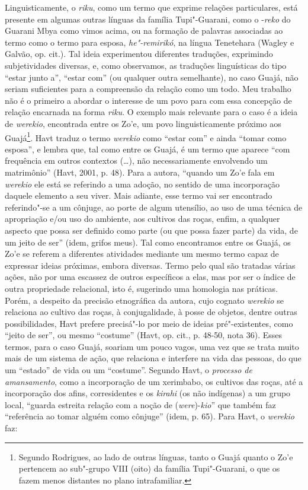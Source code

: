 Linguisticamente, o \emph{riku}, como um termo que exprime relações
particulares, está presente em algumas outras línguas da família
Tupi"-Guarani, como o -\emph{reko} do Guarani Mbya como vimos acima, ou
na formação de palavras associadas ao termo como o termo para esposa,
\emph{he"-remirikó}, na língua Tenetehara (Wagley e Galvão, op. cit.).
Tal ideia experimentou diferentes traduções, exprimindo subjetividades
diversas, e, como observamos, as traduções linguísticas do tipo ``estar
junto a'', ``estar com'' (ou qualquer outra semelhante), no caso Guajá, não
seriam suficientes para a compreensão da relação como um todo. Meu
trabalho não é o primeiro a abordar o interesse de um povo para com essa
concepção de relação encarnada na forma \emph{riku}. O exemplo mais
relevante para o caso é a ideia de \emph{werekio}, encontrada entre os
Zo'e, um povo linguisticamente próximo aos Guajá\footnote{Segundo
  Rodrigues, ao lado de outras línguas, tanto o Guajá quanto o Zo'e
  pertencem ao sub"-grupo VIII (oito) da família Tupi"-Guarani, o que os
  fazem menos distantes no plano intrafamiliar.}. Havt traduz o termo
\emph{werekio} como ``estar com'' e ainda ``tomar como esposa'', e lembra
que, tal como entre os Guajá, é um termo que aparece ``com frequência em
outros contextos (\ldots{}), não necessariamente envolvendo um matrimônio''
(Havt, 2001, p. 48). Para a autora, ``quando um Zo'e fala em
\emph{werekio} ele está se referindo a uma adoção, no sentido de uma
incorporação daquele elemento a seu viver. Mais adiante, esse termo vai
ser encontrado referindo"-se a um cônjuge, ao porte de algum utensílio,
ao uso de uma técnica de apropriação e/ou uso do ambiente, aos cultivos
das roças, enfim, a qualquer aspecto que possa ser definido como parte
(ou que possa fazer parte) da vida, de um jeito de ser'' (idem, grifos
meus). Tal como encontramos entre os Guajá, os Zo'e se referem a
diferentes atividades mediante um mesmo termo capaz de expressar ideias
próximas, embora diversas. Termo pelo qual são tratadas várias ações,
não por uma escassez de outros específicos a elas, mas por ser o índice
de outra propriedade relacional, isto é, sugerindo uma homologia nas
práticas. Porém, a despeito da precisão etnográfica da autora, cujo
cognato \emph{werekio} se relaciona ao cultivo das roças, à
conjugalidade, à posse de objetos, dentre outras possibilidades, Havt
prefere precisá"-lo por meio de ideias pré"-existentes, como ``jeito de
ser'', ou mesmo ``costume'' (Havt, op. cit., p. 48-50, nota 36). Esses
termos, para o caso Guajá, soariam um pouco vagos, uma vez que se trata
muito mais de um sistema de ação, que relaciona e interfere na vida das
pessoas, do que um ``estado'' de vida ou um ``costume''. Segundo Havt, o
\emph{processo de amansamento}, como a incorporação de um xerimbabo, os
cultivos das roças, até a incorporação dos afins, corresidentes e os
\emph{kirahi} (os não indígenas) a um grupo local, ``guarda estreita
relação com a noção de (\emph{were})-\emph{kio}'' que também faz
``referência ao tomar alguém como cônjuge'' (idem, p. 65). Para Havt, o
\emph{werekio} faz:

